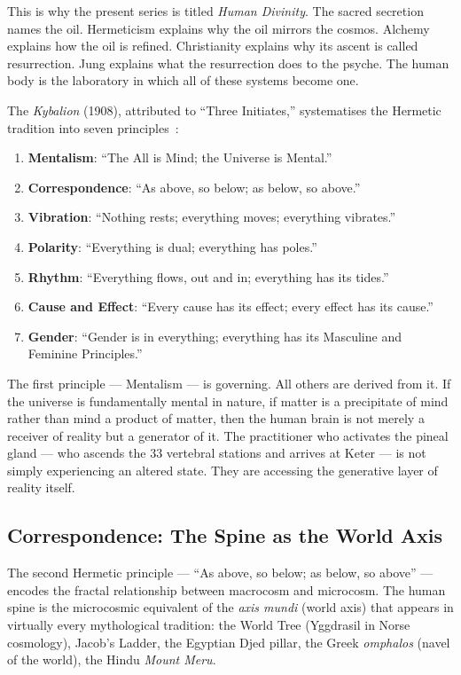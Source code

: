\documentclass[12pt, a4paper]{article}
\begin{document}
This is why the present series is titled \emph{Human Divinity}. The sacred
secretion names the oil. Hermeticism explains why the oil mirrors the cosmos.
Alchemy explains how the oil is refined. Christianity explains why its ascent
is called resurrection. Jung explains what the resurrection does to the psyche.
The human body is the laboratory in which all of these systems become one.

The \emph{Kybalion} (1908), attributed to ``Three Initiates,'' systematises the
Hermetic tradition into seven principles~\autocite{kybalion1908}:

\begin{enumerate}
  \item \textbf{Mentalism}: ``The All is Mind; the Universe is Mental.''
  \item \textbf{Correspondence}: ``As above, so below; as below, so above.''
  \item \textbf{Vibration}: ``Nothing rests; everything moves; everything vibrates.''
  \item \textbf{Polarity}: ``Everything is dual; everything has poles.''
  \item \textbf{Rhythm}: ``Everything flows, out and in; everything has its tides.''
  \item \textbf{Cause and Effect}: ``Every cause has its effect; every effect has its cause.''
  \item \textbf{Gender}: ``Gender is in everything; everything has its Masculine and Feminine Principles.''
\end{enumerate}

The first principle — Mentalism — is governing. All others are derived from
it. If the universe is fundamentally mental in nature, if matter is a
precipitate of mind rather than mind a product of matter, then the human
brain is not merely a receiver of reality but a generator of it. The
practitioner who activates the pineal gland — who ascends the 33 vertebral
stations and arrives at Keter — is not simply experiencing an altered state.
They are accessing the generative layer of reality itself.

\subsection{Correspondence: The Spine as the World Axis}

The second Hermetic principle — ``As above, so below; as below, so above'' —
encodes the fractal relationship between macrocosm and microcosm. The human
spine is the microcosmic equivalent of the \emph{axis mundi} (world axis)
that appears in virtually every mythological tradition: the World Tree
(Yggdrasil in Norse cosmology), Jacob's Ladder, the Egyptian Djed pillar, the
Greek \emph{omphalos} (navel of the world), the Hindu \emph{Mount Meru}.
\end{document}
